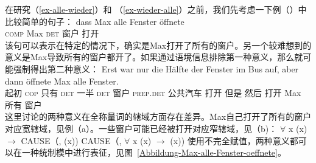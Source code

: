 在研究（\ref{ex-alle-wieder}）和 （\ref{ex-wieder-alle}）之前，我们先考虑一下例（）中比较简单的句子：
\ea
\gll dass Max alle Fenster öffnete\\
	 \textsc{comp} Max \textsc{det} 窗户 打开\\
\z
该句可以表示在特定的情况下，确实是Max打开了所有的窗户。另一个较难想到的意义是Max导致所有的窗户都开了。如果通过语境信息排除第一种意义，那么就可能强制得出第二种意义\citep{Egg99a}：
\ea
\gll Erst war nur die Hälfte der Fenster im Bus auf, aber dann öffnete Max alle Fenster.\\
     起初 \textsc{cop} 只有 \textsc{det} 一半 \textsc{det} 窗户 \textsc{prep}.\textsc{det} 公共汽车 打开 但是 然后 打开 Max 所有 窗户\\
\z
这里讨论的两种意义在全称量词的辖域方面存在差异。Max自己打开了所有的窗户对应宽辖域，见例（a）。一些窗户可能已经被打开对应窄辖域，见（b)：
\eal
\ex $\forall$ x (x) $\to$ CAUSE（, (x))
\ex CAUSE（, $\forall$ x (x) $\to$ (x))
\zl
使用不完全赋值，两种意义都可以在一种统制模中进行表征，见图~\vref{Abbildung-Max-alle-Fenster-oeffnete}。
